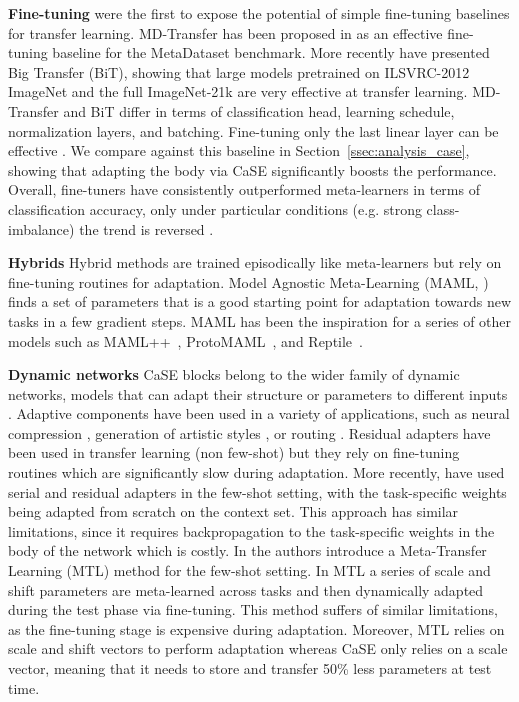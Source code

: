 \documentclass{article}
\begin{document}
\textbf{Fine-tuning} \cite{chen2019closer} were the first to expose the potential of simple fine-tuning baselines for transfer learning. MD-Transfer has been proposed in \cite{triantafillou2019meta} as an effective fine-tuning baseline for the MetaDataset benchmark.
More recently \cite{kolesnikov2020big} have presented Big Transfer (BiT), showing that large models pretrained on ILSVRC-2012 ImageNet and the full ImageNet-21k are very effective at transfer learning. MD-Transfer and BiT differ in terms of classification head, learning schedule, normalization layers, and batching. Fine-tuning only the last linear layer can be effective \citep{bauer2017discriminative, tian2020rethinking}. We compare against this baseline in Section~\ref{ssec:analysis_case}, showing that adapting the body via CaSE significantly boosts the performance.
Overall, fine-tuners have consistently outperformed meta-learners in terms of classification accuracy, only under particular conditions (e.g. strong class-imbalance) the trend is reversed \citep{ochal2021few, ochal2021sensitive}.



\textbf{Hybrids} Hybrid methods are trained episodically like meta-learners but rely on fine-tuning routines for adaptation. 
Model Agnostic Meta-Learning (MAML, \citealt{finn2017model}) finds a set of parameters that is a good starting point for adaptation towards new tasks in a few gradient steps. MAML has been the inspiration for a series of other models such as MAML++~\citep{antoniou2018train}, ProtoMAML~\citep{triantafillou2019meta}, and Reptile~\citep{nichol2018first}. 

\textbf{Dynamic networks} CaSE blocks belong to the wider family of dynamic networks, models that can adapt their structure or parameters to different inputs \citep{han2021dynamic}. Adaptive components have been used in a variety of applications, such as neural compression \citep{veit2018convolutional, wu2018blockdrop}, generation of artistic styles \citep{dumoulin2016learned, huang2017arbitrary}, or routing \citep{guo2019spottune}. Residual adapters \citep{rebuffi2017learning, rebuffi2018efficient} have been used in transfer learning (non few-shot) but they rely on fine-tuning routines which are significantly slow during adaptation.
More recently, \cite{li2022cross} have used serial and residual adapters in the few-shot setting, with the task-specific weights being adapted from scratch on the context set. This approach has similar limitations, since it requires backpropagation to the task-specific weights in the body of the network which is costly. In \cite{sun2019meta} the authors introduce a Meta-Transfer Learning (MTL) method for the few-shot setting. In MTL a series of scale and shift parameters are meta-learned across tasks and then dynamically adapted during the test phase via fine-tuning. This method suffers of similar limitations, as the fine-tuning stage is expensive during adaptation. Moreover, MTL relies on  scale and shift vectors to perform adaptation whereas CaSE only relies on a scale vector, meaning that it needs to store and transfer 50\% less parameters at test time.
\end{document}
